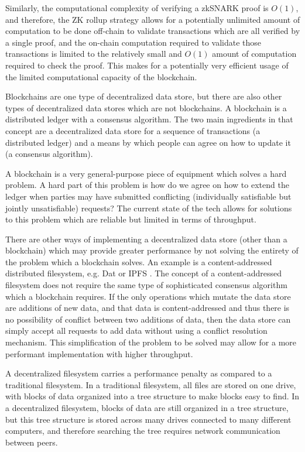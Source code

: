 \documentclass[12pt]{article}
\begin{document}
Similarly, the computational complexity of verifying a zkSNARK proof is $O(1)$, and therefore, the ZK rollup strategy allows for a potentially unlimited amount of computation to be done off-chain to validate transactions which are all verified by a single proof, and the on-chain computation required to validate those transactions is limited to the relatively small and $O(1)$ amount of computation required to check the proof. This makes for a potentially very efficient usage of the limited computational capacity of the blockchain.

Blockchains are one type of decentralized data store, but there are also other types of decentralized data stores which are not blockchains. A blockchain is a distributed ledger with a consensus algorithm. The two main ingredients in that concept are a decentralized data store for a sequence of transactions (a distributed ledger) and a means by which people can agree on how to update it (a consensus algorithm).

A blockchain is a very general-purpose piece of equipment which solves a hard problem. A hard part of this problem is how do we agree on how to extend the ledger when parties may have submitted conflicting (individually satisfiable but jointly unsatisfiable) requests? The current state of the tech allows for solutions to this problem which are reliable but limited in terms of throughput.

There are other ways of implementing a decentralized data store (other than a blockchain) which may provide greater performance by not solving the entirety of the problem which a blockchain solves. An example is a content-addressed distributed filesystem, e.g. Dat \cite{dat} or IPFS \cite{ipfs}. The concept of a content-addressed filesystem does not require the same type of sophisticated consensus algorithm which a blockchain requires. If the only operations which mutate the data store are additions of new data, and that data is content-addressed and thus there is no possibility of conflict between two additions of data, then the data store can simply accept all requests to add data without using a conflict resolution mechanism. This simplification of the problem to be solved may allow for a more performant implementation with higher throughput.

A decentralized filesystem carries a performance penalty as compared to a traditional filesystem. In a traditional filesystem, all files are stored on one drive, with blocks of data organized into a tree structure to make blocks easy to find. In a decentralized filesystem, blocks of data are still organized in a tree structure, but this tree structure is stored across many drives connected to many different computers, and therefore searching the tree requires network communication between peers.
\end{document}
